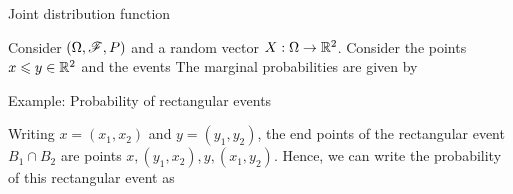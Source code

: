 \documentclass[12pt,aspectratio=169]{beamer}
\begin{document}
\begin{frame}{Joint distribution function}
\begin{Example} 
Consider $(\Omega, \mathscr{F}, P)$ and a random vector $X: \Omega \to \mathbb{R}^2$. 
Consider the points $x \leqslant y\in \mathbb{R}^2$ and the events 
The marginal probabilities are given by
\end{Example}
\end{frame}

\begin{frame}{Example: Probability of rectangular events}
\begin{Example}[Continued]
Writing $x = (x_1,x_2)$ and $y = (y_1,y_2)$, 
the end points of the rectangular event $B_1\cap B_2$ are points $x, (y_1,x_2), y, (x_1, y_2)$.
Hence, we can write the probability of this rectangular event as 
\end{Example}
\end{frame}
\end{document}
